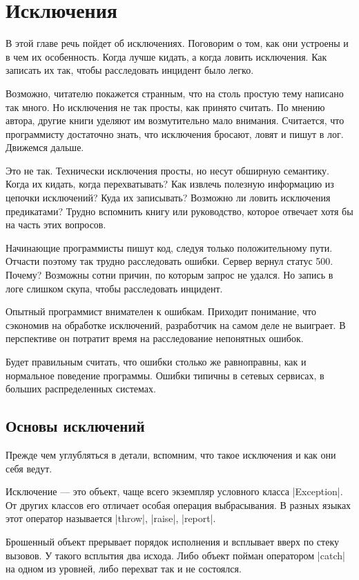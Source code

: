 \chapter{Исключения}

В этой главе речь пойдет об исключениях. Поговорим о том, как они устроены и в
чем их особенность. Когда лучше кидать, а когда ловить исключения. Как записать
их так, чтобы расследовать инцидент было легко.

Возможно, читателю покажется странным, что на столь простую тему написано так
много. Но исключения не так просты, как принято считать. По мнению автора,
другие книги уделяют им возмутительно мало внимания. Считается, что программисту
достаточно знать, что исключения бросают, ловят и пишут в лог. Движемся дальше.

Это не так. Технически исключения просты, но несут обширную семантику. Когда их
кидать, когда перехватывать? Как извлечь полезную информацию из цепочки
исключений? Куда их записывать? Возможно ли ловить исключения предикатами?
Трудно вспомнить книгу или руководство, которое отвечает хотя бы на часть этих
вопросов.

Начинающие программисты пишут код, следуя только положительному пути. Отчасти
поэтому так трудно расследовать ошибки. Сервер вернул статус 500. Почему?
Возможны сотни причин, по которым запрос не удался. Но запись в логе слишком
скупа, чтобы расследовать инцидент.

Опытный программист внимателен к ошибкам. Приходит понимание, что сэкономив на
обработке исключений, разработчик на самом деле не выиграет. В перспективе он
потратит время на расследование непонятных ошибок.

Будет правильным считать, что ошибки столько же равноправны, как и нормальное
поведение программы. Ошибки типичны в сетевых сервисах, в больших распределенных
системах.

\section{Основы исключений}

Прежде чем углубляться в детали, вспомним, что такое исключения и как они себя
ведут.

Исключение — это объект, чаще всего экземпляр условного класса \spverb|Exception|. От
других классов его отличает особая операция выбрасывания. В разных языках этот
оператор называется \spverb|throw|, \spverb|raise|, \spverb|report|.

Брошенный объект прерывает порядок исполнения и всплывает вверх по стеку
вызовов. У такого всплытия два исхода. Либо объект пойман оператором \spverb|catch| на
одном из уровней, либо перехват так и не состоялся.

